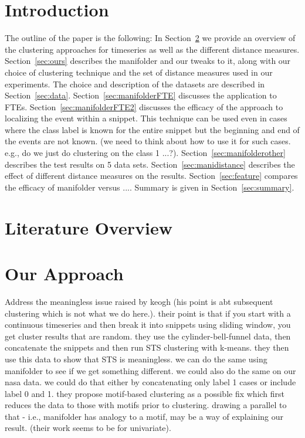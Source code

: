 \documentclass[aps,preprint,superscriptaddress]{revtex4}
\begin{document}
\section{Introduction}


The outline of the paper is the following: In Section~\ref{sec:background} we provide an overview of the clustering approaches for timeseries as well as the different distance measures. Section~\ref{sec:ours} describes the manifolder and our tweaks to it, along with our choice of clustering technique and the set of distance measures used in our experiments. The choice and description of the datasets are described in Section~\ref{sec:data}.  Section~\ref{sec:manifolderFTE} discusses the application to FTEs.
Section~\ref{sec:manifolderFTE2} discusses the efficacy of the approach to localizing the event within a snippet. This technique can be used even in cases where the class label is known for the entire snippet but the beginning and end of the events are not known. (we need to think about how to use it for such cases. e.g., do we just do clustering on the class 1 ...?).
Section~\ref{sec:manifolderother} describes the test results on 5 data sets.
Section~\ref{sec:manidistance} describes the effect of different distance measures on the results.
Section~\ref{sec:feature} compares the efficacy of manifolder versus ....
Summary is given in Section~\ref{sec:summary}. 


\section{Literature Overview}
\label{sec:background}


\section{Our Approach}
Address the meaningless issue raised by keogh (his point is abt subsequent clustering which is not what we do here.). their point is that if you start with a continuous timeseries and then break it into snippets using sliding window, you get cluster results that are random. they use the cylinder-bell-funnel data, then concatenate the snippets and then run STS clustering with k-means. they then use this data to show that STS is meaningless. we can do the same using manifolder to see if we get something different. we could also do the same on our nasa data. we could do that either by concatenating only label 1 cases or include label 0 and 1.  they propose motif-based clustering as a possible fix which first reduces the data to those with motifs prior to clustering. drawing a parallel to that - i.e., manifolder has analogy to a motif, may be a way of explaining our result. (their work seems to be for univariate).
\end{document}
